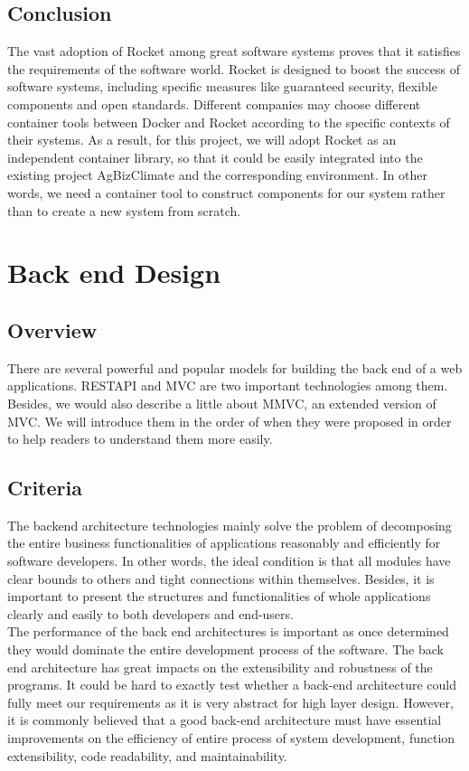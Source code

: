 \documentclass[letterpaper,10pt]{article}
\begin{document}
	\subsection{Conclusion}
  The vast adoption of Rocket among great software systems proves that it satisfies the requirements of the software world. Rocket is designed to boost the success of software systems, including specific measures like guaranteed security, flexible components and open standards. Different companies may choose different container tools between Docker and Rocket according to the specific contexts of their systems.
  As a result, for this project, we will adopt Rocket as an independent container library, so that it could be easily integrated into the existing project AgBizClimate and the corresponding environment. In other words, we need a container tool to construct components for our system rather than to create a new system from scratch.


\section{Back end Design}
	\subsection{Overview}
        There are several powerful and popular models for building the back end of a web applications. RESTAPI and MVC are two important technologies among them. Besides, we would also describe a little about MMVC, an extended version of MVC. We will introduce them in the order of when they were proposed in order to help readers to understand them more easily.

	\subsection{Criteria}
  The backend architecture technologies mainly solve the problem of decomposing the entire business functionalities of applications reasonably and efficiently for software developers. In other words, the ideal condition is that all modules have clear bounds to others and tight connections within themselves. Besides, it is important to present the structures and functionalities of whole applications clearly and easily to both developers and end-users.\\
  The performance of the back end architectures is important as once determined they would dominate the entire development process of the software. The back end architecture has great impacts on the extensibility and robustness of the programs. It could be hard to exactly test whether a back-end architecture could fully meet our requirements as it is very abstract for high layer design. However, it is commonly believed that a good back-end architecture must have essential improvements on the efficiency of entire process of system development, function extensibility, code readability, and maintainability.
\end{document}
